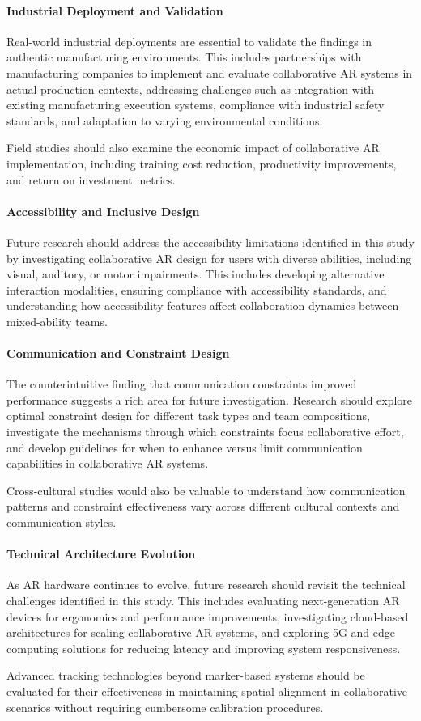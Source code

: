 \paragraph{Industrial Deployment and Validation}
Real-world industrial deployments are essential to validate the findings in authentic manufacturing environments. This includes partnerships with manufacturing companies to implement and evaluate collaborative AR systems in actual production contexts, addressing challenges such as integration with existing manufacturing execution systems, compliance with industrial safety standards, and adaptation to varying environmental conditions.

Field studies should also examine the economic impact of collaborative AR implementation, including training cost reduction, productivity improvements, and return on investment metrics.

\paragraph{Accessibility and Inclusive Design}
Future research should address the accessibility limitations identified in this study by investigating collaborative AR design for users with diverse abilities, including visual, auditory, or motor impairments. This includes developing alternative interaction modalities, ensuring compliance with accessibility standards, and understanding how accessibility features affect collaboration dynamics between mixed-ability teams.

\paragraph{Communication and Constraint Design}
The counterintuitive finding that communication constraints improved performance suggests a rich area for future investigation. Research should explore optimal constraint design for different task types and team compositions, investigate the mechanisms through which constraints focus collaborative effort, and develop guidelines for when to enhance versus limit communication capabilities in collaborative AR systems.

Cross-cultural studies would also be valuable to understand how communication patterns and constraint effectiveness vary across different cultural contexts and communication styles.

\paragraph{Technical Architecture Evolution}
As AR hardware continues to evolve, future research should revisit the technical challenges identified in this study. This includes evaluating next-generation AR devices for ergonomics and performance improvements, investigating cloud-based architectures for scaling collaborative AR systems, and exploring 5G and edge computing solutions for reducing latency and improving system responsiveness.

Advanced tracking technologies beyond marker-based systems should be evaluated for their effectiveness in maintaining spatial alignment in collaborative scenarios without requiring cumbersome calibration procedures.